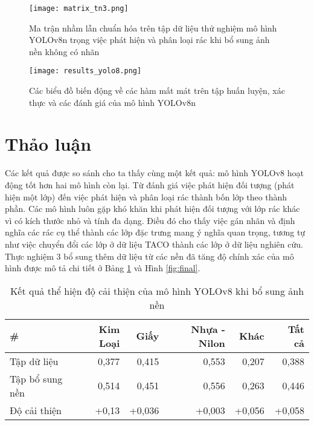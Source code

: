 \documentclass[../the.tex]{subfiles}
\begin{document}
\begin{figure}[H]
    \centering
    \texttt{[image: matrix\_tn3.png]}
    \caption{Ma trận nhầm lẫn chuẩn hóa trên tập dữ liệu thử nghiệm mô hình YOLOv8n trọng việc phát hiện và phân loại rác khi bổ sung ảnh nền không có nhãn}
    \label{fig:thucnghiem3.1}
\end{figure}

\begin{figure}[H]
    \centering
    \texttt{[image: results\_yolo8.png]}
    \caption{Các biểu đồ biến động về các hàm mất mát trên tập huấn luyện, xác thực và các đánh giá của mô hình YOLOv8n}
    \label{fig:thucnghiem3.2}
\end{figure}


\section{Thảo luận}
 {\fontsize{13}{12} \selectfont

  Các kết quả được so sánh cho ta thấy cùng một kết quả: mô hình YOLOv8 hoạt động tốt hơn hai mô hình còn lại.
  Từ đánh giá việc phát hiện đối tượng (phát hiện một lớp) đến việc phát hiện và phân loại rác thành bốn lớp theo thành phần.
  Các mô hình luôn gặp khó khăn khi phát hiện đối tượng với lớp rác khác vì có kích thước nhỏ và tính đa dạng.
  Điều đó cho thấy việc gán nhãn và định nghĩa các rác cụ thể thành các lớp đặc trưng mang ý nghĩa quan trọng,
  tương tự như việc chuyển đổi các lớp ở dữ liệu TACO thành các lớp ở dữ liệu nghiên cứu.
  Thực nghiệm 3 bổ sung thêm dữ liệu từ các nền đã tăng độ chính xác của mô hình được mô tả chi tiết ở Bảng \ref{tab:thaoluan1} và Hình \ref{fig:final}.

 }


\begin{table}[h!]
    \centering
    \begin{threeparttable}
        \caption{Kết quả thể hiện độ cải thiện của mô hình YOLOv8 khi bổ sung ảnh nền}
        \begin{tabular}{lrrrrr}
            \hline
            \multicolumn{1}{l}{\textbf{\#}} & \textbf{Kim Loại} & \textbf{Giấy} & \textbf{Nhựa - Nilon} & \textbf{Khác} & \textbf{Tất cả} \\ \hline
            Tập dữ liệu                     & 0,377             & 0,415         & 0,553                 & 0,207         & 0,388           \\ \hline
            Tập bổ sung nền                 & 0,514             & 0,451         & 0,556                 & 0,263         & 0,446           \\ \hline
            Độ cải thiện                    & +0,13             & +0,036        & +0,003                & +0,056        & +0,058          \\ \hline
        \end{tabular}
        \label{tab:thaoluan1}
    \end{threeparttable}
\end{table}
\end{document}
